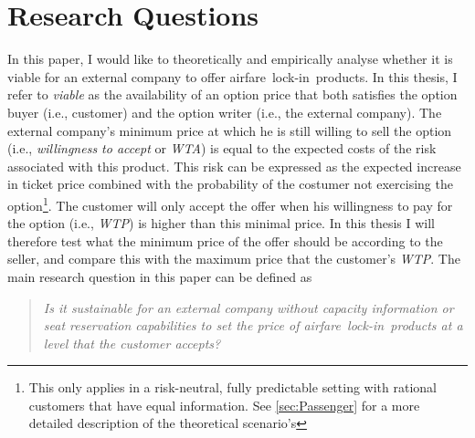 \chapter{Research Questions}
\label{chap:ResearchQuestions}
In this paper, I would like to theoretically and empirically analyse whether it is viable for an external company to offer airfare~lock-in~products. In this thesis, I refer to \emph{viable} as the availability of an option price that both satisfies the option buyer (i.e., customer) and the option writer (i.e., the external company). The external company's minimum price at which he is still willing to sell the option (i.e., \emph{willingness to accept} or \emph{WTA}) is equal to the expected costs of the risk associated with this product. This risk can be expressed as the expected increase in ticket price combined with the probability of the costumer not exercising the option\footnote{This only applies in a risk-neutral, fully predictable setting with rational customers that have equal information. See \autoref{sec:Passenger} for a more detailed description of the theoretical scenario's}. The customer will only accept the offer when his willingness to pay for the option (i.e., \emph{WTP}) is higher than this minimal price. In this thesis I will therefore test what the minimum price of the offer should be according to the seller, and compare this with the maximum price that the customer's \emph{WTP}. The main research question in this paper can be defined as

\begin{quote}\emph{Is it sustainable for an external company without capacity information or seat reservation capabilities to set the price of airfare~lock-in~products at a level that the customer accepts?}\end{quote}

